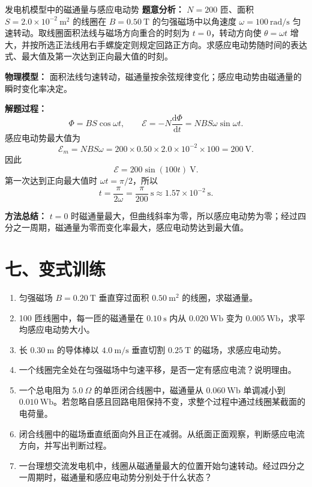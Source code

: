 \begin{examplebox}{发电机模型中的磁通量与感应电动势}
\textbf{题意分析：} $N=200$ 匝、面积 $S=2.0\times10^{-2}\ \mathrm{m^2}$ 的线圈在 $B=0.50\ \mathrm{T}$ 的匀强磁场中以角速度 $\omega=100\ \mathrm{rad/s}$ 匀速转动。取线圈面积法线与磁场方向重合的时刻为 $t=0$，转动方向使 $\theta=\omega t$ 增大，并按所选正法线用右手螺旋定则规定回路正方向。求感应电动势随时间的表达式、最大值及第一次达到正向最大值的时刻。

\textbf{物理模型：} 面积法线匀速转动，磁通量按余弦规律变化；感应电动势由磁通量的瞬时变化率决定。

\begin{center}

\end{center}

\textbf{解题过程：}
\[
\Phi=BS\cos\omega t,
\qquad
\mathcal E=-N\frac{\mathrm d\Phi}{\mathrm dt}
=NBS\omega\sin\omega t.
\]
感应电动势最大值为
\[
\mathcal E_m=NBS\omega
=200\times0.50\times2.0\times10^{-2}\times100
=200\ \mathrm V.
\]
因此
\[
\boxed{\mathcal E=200\sin(100t)\ \mathrm V}.
\]
第一次达到正向最大值时 $\omega t=\pi/2$，所以
\[
\boxed{t=\frac{\pi}{2\omega}=\frac{\pi}{200}\ \mathrm s
\approx1.57\times10^{-2}\ \mathrm s}.
\]

\textbf{方法总结：} $t=0$ 时磁通量最大，但曲线斜率为零，所以感应电动势为零；经过四分之一周期，磁通量为零而变化率最大，感应电动势达到最大值。
\end{examplebox}

\section*{七、变式训练}

\begin{enumerate}
  \item 匀强磁场 $B=0.20\ \mathrm{T}$ 垂直穿过面积 $0.50\ \mathrm{m^2}$ 的线圈，求磁通量。
  \item 100 匝线圈中，每一匝的磁通量在 $0.10\ \mathrm{s}$ 内从 $0.020\ \mathrm{Wb}$ 变为 $0.005\ \mathrm{Wb}$，求平均感应电动势大小。
  \item 长 $0.30\ \mathrm{m}$ 的导体棒以 $4.0\ \mathrm{m/s}$ 垂直切割 $0.25\ \mathrm{T}$ 的磁场，求感应电动势。
  \item 一个线圈完全处在匀强磁场中匀速平移，是否一定有感应电流？说明理由。
  \item 一个总电阻为 $5.0\ \Omega$ 的单匝闭合线圈中，磁通量从 $0.060\ \mathrm{Wb}$ 单调减小到 $0.010\ \mathrm{Wb}$。若忽略自感且回路电阻保持不变，求整个过程中通过线圈某截面的电荷量。
  \item 闭合线圈中的磁场垂直纸面向外且正在减弱。从纸面正面观察，判断感应电流方向，并写出判断过程。
  \begin{center}
  
  \end{center}
  \item 一台理想交流发电机中，线圈从磁通量最大的位置开始匀速转动。经过四分之一周期时，磁通量和感应电动势分别处于什么状态？
\end{enumerate}

